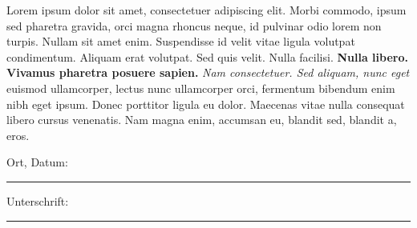 
Lorem ipsum dolor sit amet, consectetuer adipiscing elit. Morbi commodo, ipsum sed pharetra gravida, orci magna rhoncus neque, id pulvinar odio lorem non turpis. Nullam sit amet enim. Suspendisse id velit vitae ligula volutpat condimentum. Aliquam erat volutpat. Sed quis velit. Nulla facilisi. \textbf{Nulla libero. Vivamus pharetra posuere sapien.} \textit{Nam consectetuer. Sed aliquam, nunc eget} euismod ullamcorper, lectus nunc ullamcorper orci, fermentum bibendum enim nibh eget ipsum. Donec porttitor ligula eu dolor. Maecenas vitae nulla consequat libero cursus venenatis. Nam magna enim, accumsan eu, blandit sed, blandit a, eros.
\vspace{36pt}

Ort, Datum:\\
\rule[1em]{25em}{0.5pt}

\vfill\vfill

Unterschrift:\\
\rule[1em]{25em}{0.5pt}






























